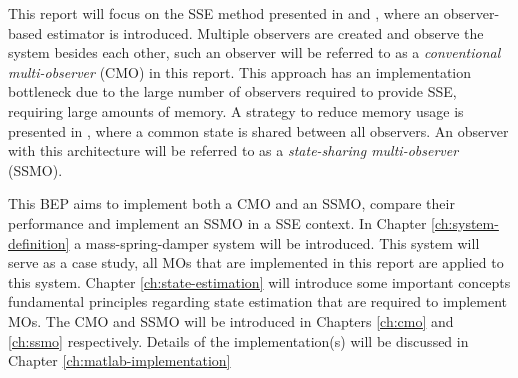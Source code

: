 This report will focus on the SSE method presented in \cite{Chong2015ObservabilityAttacks} and \cite{Chong2020AAttacks}, where an observer-based estimator is introduced. Multiple observers are created and observe the system besides each other, such an observer will be referred to as a \textit{conventional multi-observer} (CMO) in this report. This approach has an implementation bottleneck due to the large number of observers required to provide SSE, requiring large amounts of memory. A strategy to reduce memory usage is presented in \cite{Chong2023MemoryAlgorithms}, where a common state is shared between all observers. An observer with this architecture will be referred to as a \textit{state-sharing multi-observer} (SSMO). 

This BEP aims to implement both a CMO and an SSMO, compare their performance and implement an SSMO in a SSE context. In Chapter \ref{ch:system-definition} a mass-spring-damper system will be introduced. This system will serve as a case study, all MOs that are implemented in this report are applied to this system. Chapter \ref{ch:state-estimation} will introduce some important concepts fundamental principles regarding state estimation that are required to implement MOs. The CMO and SSMO will be introduced in Chapters \ref{ch:cmo} and \ref{ch:ssmo} respectively. Details of the implementation(s) will be discussed in Chapter \ref{ch:matlab-implementation}